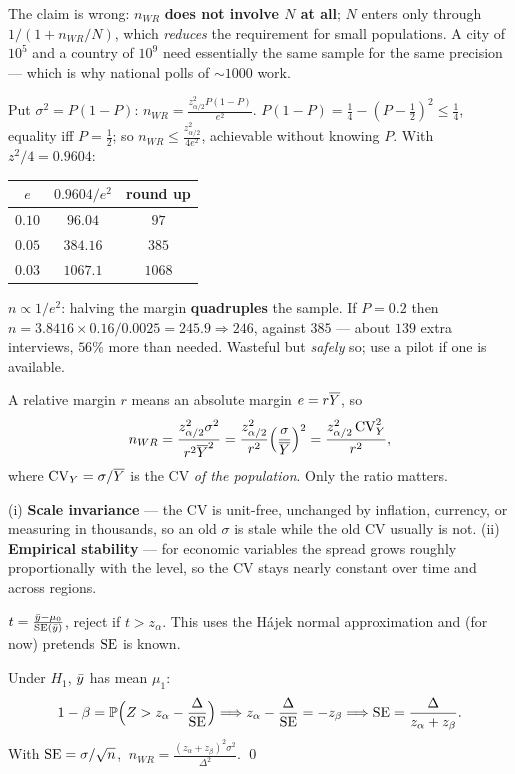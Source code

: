  The claim is wrong: $n_{WR}$ \textbf{does not involve $N$ at all}; $N$ enters only through
$1/(1+n_{WR}/N)$, which \emph{reduces} the requirement for small populations. A city of $10^5$
and a country of $10^9$ need essentially the same sample for the same precision --- which is why
national polls of $\sim1000$ work.

 Put $\sigma^2=P(1-P)$: $n_{WR}=\frac{z^2_{\alpha/2}P(1-P)}{e^2}$.
 $P(1-P)=\frac14-(P-\frac12)^2\le\frac14$, equality iff $P=\frac12$; so
$n_{WR}\le\frac{z^2_{\alpha/2}}{4e^2}$, achievable without knowing $P$.
 With $z^2/4=0.9604$:
\begin{center}
\begin{tabular}{@{}ccc@{}}
\toprule $e$ & $0.9604/e^2$ & round up \\ \midrule
$0.10$ & $96.04$ & $97$ \\ $0.05$ & $384.16$ & $385$ \\ $0.03$ & $1067.1$ & $1068$ \\
\bottomrule\end{tabular}
\end{center}
$n\propto1/e^2$: halving the margin \textbf{quadruples} the sample.
 If $P=0.2$ then $n=3.8416\times0.16/0.0025=245.9\Rightarrow246$, against $385$ --- about
$139$ extra interviews, $56\%$ more than needed. Wasteful but \emph{safely} so; use a pilot if
one is available.

 A relative margin $r$ means an absolute margin $e=r\overline{Y}$, so
\[
  n_{WR}=\frac{z^2_{\alpha/2}\sigma^2}{r^2\overline{Y}^2}=\frac{z^2_{\alpha/2}}{r^2}\Big(\frac{\sigma}{\overline{Y}}\Big)^2
  =\frac{z^2_{\alpha/2}\operatorname{CV}_Y^2}{r^2},
\]
where $\operatorname{CV}_Y=\sigma/\overline{Y}$ is the CV \emph{of the population}. Only the ratio matters.

 (i) \textbf{Scale invariance} --- the CV is unit-free, unchanged by inflation, currency, or
measuring in thousands, so an old $\sigma$ is stale while the old CV usually is not.
(ii) \textbf{Empirical stability} --- for economic variables the spread grows roughly
proportionally with the level, so the CV stays nearly constant over time and across regions.

 $t=\frac{\bar{y}-\mu_0}{\operatorname{SE}(\bar{y})}$, reject if $t>z_\alpha$. This uses the H\'ajek normal
approximation and (for now) pretends $\operatorname{SE}$ is known.

 Under $H_1$, $\bar{y}$ has mean $\mu_1$:
\[
  1-\beta=\mathbb{P}\Big(Z>z_\alpha-\frac{\Delta}{\operatorname{SE}}\Big)
  \Longrightarrow z_\alpha-\frac{\Delta}{\operatorname{SE}}=-z_\beta
  \Longrightarrow \operatorname{SE}=\frac{\Delta}{z_\alpha+z_\beta}.
\]
With $\operatorname{SE}=\sigma/\sqrt n$, $\ n_{WR}=\frac{(z_\alpha+z_\beta)^2\sigma^2}{\Delta^2}$. \qed

